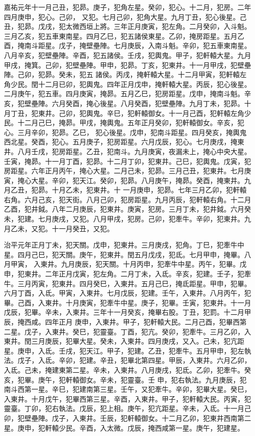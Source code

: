 \begin{pinyinscope}
 嘉祐元年十一月己丑，犯昴。庚子，犯角左星。癸卯，犯心。十二月，犯房。二年四月庚申，犯心。己卯，
 又犯。七月己卯，犯角大星。九月丁丑，犯心後星。己丑，犯昴。戊戌，犯太微西垣上將。三年正月庚寅，犯左角。二月癸卯，入斗魁。三月乙亥，犯五車東南星。四月乙巳，犯五諸侯東星。乙卯，掩房距星。五月乙酉，掩南斗距星。戊子，掩壁壘陣。七月庚辰，入南斗魁。辛卯，犯五車東南星。八月辛亥，犯壁壘陣。辛酉，犯五諸侯。壬戌，犯輿鬼。甲子，犯軒轅大星。九月甲戌，掩箕。己卯，犯壁壘陣。甲申，犯昴。丁亥，犯東井。十一月甲戌，犯壁壘陣。己卯，犯昴。癸未，犯五
 諸侯。丙戌，掩軒轅大星。十二月甲寅，犯軒轅左角少民。閏十二月已卯，犯輿鬼。四年正月戊申，掩軒轅大星。丙辰，犯心後星。二月庚午，犯五車。四月庚寅，掩昴。五月乙巳，犯房距星。戊申，掩南斗魁。辛亥，犯壁壘陣。六月癸酉，掩心後星。八月癸酉，犯壁壘陣。九月丁未，犯昴。十月丁丑，犯東井。己卯，犯輿鬼。辛巳，犯軒轅御女。十一月己酉，犯軒轅左角少民。十二月己巳，掩昴。甲戌，掩輿鬼。五年正月癸卯，犯軒轅御女。辛亥，犯心。三月辛卯，犯昴。乙巳，
 犯心後星。戊申，犯南斗距星。四月癸亥，掩輿鬼西北星。癸酉，犯心。五月庚子，犯房距星。六月戊辰，犯心。七月庚戌，掩東井。八月壬戌，犯房距星。乙丑，犯南斗。九月庚寅，夜漏未上，掩心中央大星。壬寅，掩昴。十一月丁酉，犯昴。十二月丁卯，犯東井。己巳，犯輿鬼。戊寅，犯房距星。六年正月丙午，掩心大星。二月己未，犯昴。三月己丑，犯東井。七月庚寅，掩心大星。辛卯，犯天江。癸卯，犯昴。八月庚午，掩昴。癸酉，掩東井。九月乙丑，犯昴。十月乙未，犯東井。十
 一月庚申，犯昴。七年三月乙卯，犯軒轅右角。六月己亥，犯天街。八月己卯，犯房距星。九月丙辰，犯軒轅右角。十二月乙酉，犯井鉞。八年二月庚辰，犯東井。庚寅，犯房。三月丁未，犯井鉞。六月癸未，犯建。七月庚戌，又犯。八月甲戌，犯房。己卯，犯牽牛。辛卯，犯東井。九月乙未，又犯。十一月癸丑，又犯。



 治平元年正月丁未，犯天關。戊申，犯東井。三月庚戌，犯角。丁巳，犯牽牛中星。四月己巳，犯天關。庚午，犯東井。閏五月戊戌，犯氐。七月甲申，掩畢。八月甲寅，
 入東井。九月庚辰，犯天關。十月丙申，犯牽牛中星。丙午，犯畢。戊申，犯東井。二年正月戊寅，犯左角。二月丁未，入氐。辛亥，犯建。壬子，犯牽牛。三月丙寅，犯東井。四月癸巳，入東井。五月己巳，掩氐距星。甲申，犯畢。六月丁酉，入氐。甲寅，入東井。七月戊辰，犯建。壬午，入東井。八月丙午，犯畢。己酉，入東井。十月庚寅，犯牽牛中星。庚子，犯畢。壬寅，犯東井。十一月戊辰，犯畢。辛未，入東井。三年十一月癸亥，掩畢右股。丁丑，犯罰。十二月甲辰，掩西咸。四年正月
 庚申，入東井。甲子，犯軒轅大民。二月己酉，犯畢西第二星。戊子，入東井。癸巳，犯靈臺。丁酉，犯亢。癸卯，犯牽牛。三月乙卯，入東井。閏三月庚辰，犯畢大星。癸未，入東井。四月庚戌，又入。己未，犯亢距星。庚申，入氐。壬戌，犯天江。甲子，犯建。乙丑，犯牽牛。五月甲申，犯左執法。戊子，入氐。辛卯，犯建。辛丑，犯畢北第四星。甲辰，入東井。六月乙卯，入氐。己未，掩建東第二星。辛未，入東井。八月庚戌，犯氐。乙卯，犯牽牛。癸亥，犯畢。庚午，犯軒轅御女。辛未，犯靈臺。壬
 申，犯右執法。九月庚辰，犯南斗西第一星。辛巳，犯建南第三星。壬午，又犯牽牛。辛卯，犯畢大星。癸巳，入東井。十月戊午，犯畢西第三星。辛酉，入東井。甲子，犯軒轅大民。丙寅，犯靈臺。丁卯，犯右執法。戊辰，犯上相。庚午，犯亢距星。辛未，入氐。十一月己卯，犯壁壘陣。戊子，入東井。壬辰，犯軒轅御女。十二月乙卯，犯東井西南第二星。庚申，犯軒轅少民。辛酉，入太微。戊辰，掩西咸第一星。庚午，犯建星。




\end{pinyinscope}
